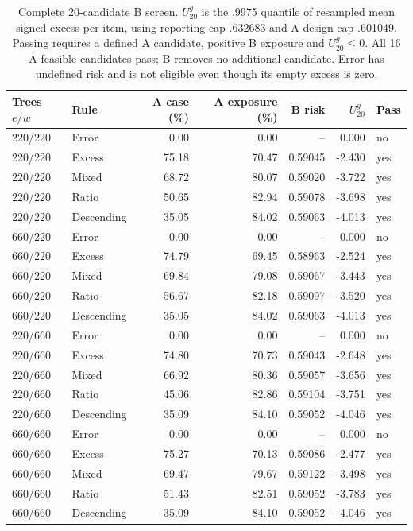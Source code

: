 \begin{table}[t]\centering\scriptsize
\caption{Complete 20-candidate B screen. $U^{g}_{20}$ is the .9975 quantile of resampled mean signed excess per item, using reporting cap .632683 and A design cap .601049. Passing requires a defined A candidate, positive B exposure and $U^{g}_{20}\leq0$. All 16 A-feasible candidates pass; B removes no additional candidate. Error has undefined risk and is not eligible even though its empty excess is zero.}\label{tab:v7-B}
\begin{tabular}{llrrrrl}\toprule
Trees $e/w$ & Rule & A case (\%) & A exposure (\%) & B risk & $U^g_{20}$ & Pass\\\midrule
220/220 & Error & 0.00 & 0.00 & -- & 0.000 & no \\
220/220 & Excess & 75.18 & 70.47 & 0.59045 & -2.430 & yes \\
220/220 & Mixed & 68.72 & 80.07 & 0.59020 & -3.722 & yes \\
220/220 & Ratio & 50.65 & 82.94 & 0.59078 & -3.698 & yes \\
220/220 & Descending & 35.05 & 84.02 & 0.59063 & -4.013 & yes \\
660/220 & Error & 0.00 & 0.00 & -- & 0.000 & no \\
660/220 & Excess & 74.79 & 69.45 & 0.58963 & -2.524 & yes \\
660/220 & Mixed & 69.84 & 79.08 & 0.59067 & -3.443 & yes \\
660/220 & Ratio & 56.67 & 82.18 & 0.59097 & -3.520 & yes \\
660/220 & Descending & 35.05 & 84.02 & 0.59063 & -4.013 & yes \\
220/660 & Error & 0.00 & 0.00 & -- & 0.000 & no \\
220/660 & Excess & 74.80 & 70.73 & 0.59043 & -2.648 & yes \\
220/660 & Mixed & 66.92 & 80.36 & 0.59057 & -3.656 & yes \\
220/660 & Ratio & 45.06 & 82.86 & 0.59104 & -3.751 & yes \\
220/660 & Descending & 35.09 & 84.10 & 0.59052 & -4.046 & yes \\
660/660 & Error & 0.00 & 0.00 & -- & 0.000 & no \\
660/660 & Excess & 75.27 & 70.13 & 0.59086 & -2.477 & yes \\
660/660 & Mixed & 69.47 & 79.67 & 0.59122 & -3.498 & yes \\
660/660 & Ratio & 51.43 & 82.51 & 0.59052 & -3.783 & yes \\
660/660 & Descending & 35.09 & 84.10 & 0.59052 & -4.046 & yes \\
\bottomrule\end{tabular}\end{table}
